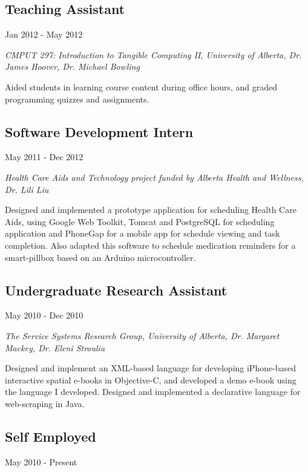 \documentclass[10pt]{article}
\begin{document}
\subsection*{Teaching Assistant}
Jan 2012 - May 2012

\emph{CMPUT 297: Introduction to Tangible Computing II, University of Alberta, Dr. James Hoover, Dr. Michael Bowling}
\vspace{\baselineskip}

Aided students in learning course content during office hours, and graded programming quizzes and assignments.

\subsection*{Software Development Intern}
May 2011 - Dec 2012

\emph{Health Care Aids and Technology project funded by Alberta Health and Wellness, Dr. Lili Liu}
\vspace{\baselineskip}

Designed and implemented a prototype application for scheduling Health Care Aids, using Google Web Toolkit, Tomcat and PostgreSQL for scheduling application and PhoneGap for a mobile app for schedule viewing and task completion. Also adapted this software to schedule medication reminders for a smart-pillbox based on an Arduino microcontroller.

\subsection*{Undergraduate Research Assistant}
May 2010 - Dec 2010

\emph{The Service Systems Research Group, University of Alberta, Dr. Margaret Mackey, Dr. Eleni Stroulia}
\vspace{\baselineskip}

Designed and implement an XML-based language for developing iPhone-based interactive spatial e-books in Objective-C, and developed a demo e-book using the language I developed. Designed and implemented a declarative language for web-scraping in Java.



\subsection*{Self Employed}
May 2010 - Present
\vspace{\baselineskip}
\end{document}
